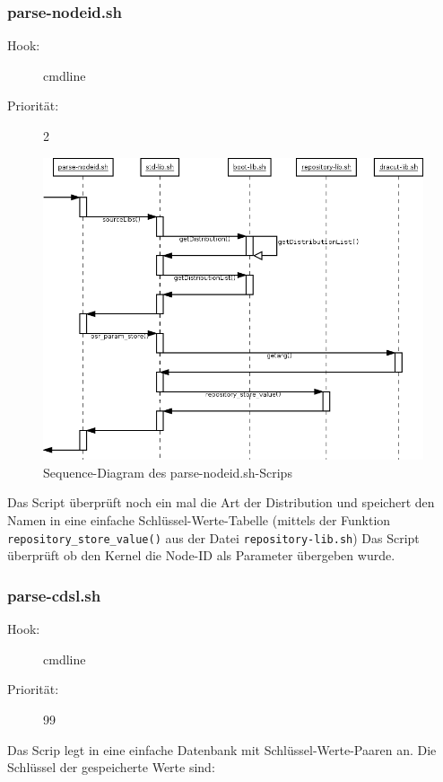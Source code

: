 \documentclass[10pt,a4paper]{article}
\begin{document}
\subsubsection{parse-nodeid.sh}
\begin{description}
\item[Hook:] cmdline
\item[Priorität:] 2
\end{description}

\begin{figure}[H]
 \centering
 \includegraphics[scale=0.35]{./sequence_diagram_parse-nodeid_DE_de.png}
 \caption[]{Sequence-Diagram des parse-nodeid.sh-Scrips}
\end{figure}

Das Script überprüft noch ein mal die Art der Distribution und speichert den Namen in eine einfache Schlüssel-Werte-Tabelle (mittels der Funktion \texttt{repository\_store\_value()} aus der Datei  \texttt{repository-lib.sh})
Das Script überprüft ob den Kernel die Node-ID als Parameter übergeben wurde.


\subsubsection{parse-cdsl.sh}
\begin{description}
\item[Hook:] cmdline
\item[Priorität:] 99
\end{description}

Das Scrip legt in eine einfache Datenbank mit Schlüssel-Werte-Paaren an. Die Schlüssel der gespeicherte Werte sind:
\end{document}
